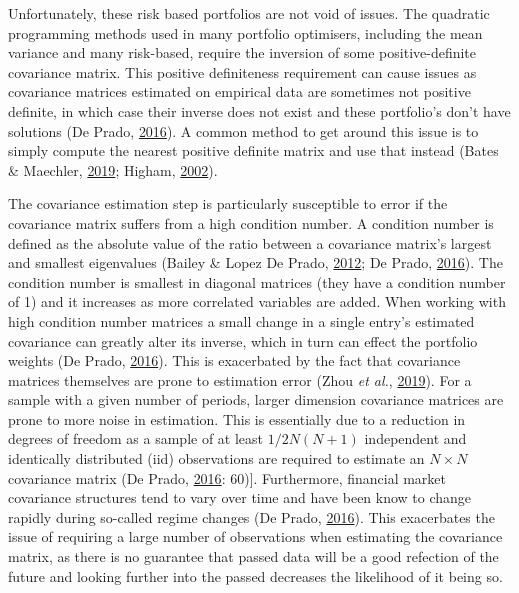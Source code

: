 \documentclass[11pt,preprint, authoryear]{elsarticle}
\numberwithin{equation}{section}
\numberwithin{figure}{section}
\numberwithin{table}{section}
\begin{document}
Unfortunately, these risk based portfolios are not void of issues. The
quadratic programming methods used in many portfolio optimisers,
including the mean variance and many risk-based, require the inversion
of some positive-definite covariance matrix. This positive definiteness
requirement can cause issues as covariance matrices estimated on
empirical data are sometimes not positive definite, in which case their
inverse does not exist and these portfolio's don't have solutions (De
Prado, \protect\hyperlink{ref-lopez}{2016}). A common method to get
around this issue is to simply compute the nearest positive definite
matrix and use that instead (Bates \& Maechler,
\protect\hyperlink{ref-Matrix}{2019}; Higham,
\protect\hyperlink{ref-higham2002}{2002}).

The covariance estimation step is particularly susceptible to error if
the covariance matrix suffers from a high condition number. A condition
number is defined as the absolute value of the ratio between a
covariance matrix's largest and smallest eigenvalues (Bailey \& Lopez De
Prado, \protect\hyperlink{ref-lopez2012}{2012}; De Prado,
\protect\hyperlink{ref-lopez}{2016}). The condition number is smallest
in diagonal matrices (they have a condition number of 1) and it
increases as more correlated variables are added. When working with high
condition number matrices a small change in a single entry's estimated
covariance can greatly alter its inverse, which in turn can effect the
portfolio weights (De Prado, \protect\hyperlink{ref-lopez}{2016}). This
is exacerbated by the fact that covariance matrices themselves are prone
to estimation error (Zhou \emph{et al.},
\protect\hyperlink{ref-zhou2019}{2019}). For a sample with a given
number of periods, larger dimension covariance matrices are prone to
more noise in estimation. This is essentially due to a reduction in
degrees of freedom as a sample of at least \(1/2N(N+1)\) independent and
identically distributed (iid) observations are required to estimate an
\(N\times N\) covariance matrix (De Prado,
\protect\hyperlink{ref-lopez}{2016}: 60){]}. Furthermore, financial
market covariance structures tend to vary over time and have been know
to change rapidly during so-called regime changes (De Prado,
\protect\hyperlink{ref-lopez}{2016}). This exacerbates the issue of
requiring a large number of observations when estimating the covariance
matrix, as there is no guarantee that passed data will be a good
refection of the future and looking further into the passed decreases
the likelihood of it being so.
\end{document}
